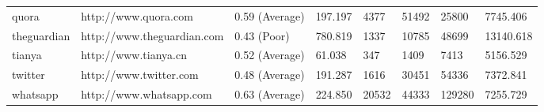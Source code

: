 \begin{table}[]
{\begin{tabular}{|l|l|l|l|l|l|l|l|}
\rowcolor[HTML]{EFEFEF} 
quora             & http://www.quora.com       & 0.59 (Average)                                                                                & 197.197                                                                           & 4377                                                           & 51492                                                         & 25800                                                                & 7745.406                                                                       \\
theguardian       & http://www.theguardian.com & 0.43 (Poor)                                                                                & 780.819                                                                           & 1337                                                           & 10785                                                         & 48699                                                                & 13140.618                                                                      \\
\rowcolor[HTML]{EFEFEF} 
tianya            & http://www.tianya.cn       & 0.52 (Average)                                                                                & 61.038                                                                            & 347                                                            & 1409                                                          & 7413                                                                 & 5156.529                                                                       \\
twitter           & http://www.twitter.com     & 0.48 (Average)                                                                                                                                                                & 191.287                                                                           & 1616                                                           & 30451                                                         & 54336                                                                & 7372.841                                                                       \\
\rowcolor[HTML]{EFEFEF} 
whatsapp          & http://www.whatsapp.com    & 0.63 (Average)                                                                                & 224.850                                                                           & 20532                                                          & 44333                                                         & 129280                                                               & 7255.729                                                                       \\

\end{tabular}}
\end{table}
